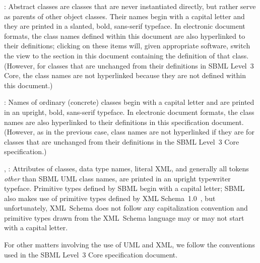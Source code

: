 \begin{description}

\item {}: Abstract classes are classes that
are never instantiated directly, but rather serve as parents of other
object classes. Their names begin with a capital letter and they are
printed in a slanted, bold, sans-serif typeface. In electronic document
formats, the class names defined within this document are also
hyperlinked to their definitions; clicking on these items will, given
appropriate software, switch the view to the section in this document
containing the definition of that class. (However, for classes that are
unchanged from their definitions in SBML Level~3 Core, the class names
are not hyperlinked because they are not defined within this document.)

\item {}: Names of ordinary (concrete) classes begin with a
capital letter and are printed in an upright, bold, sans-serif typeface.
In electronic document formats, the class names are also hyperlinked to
their definitions in this specification document. (However, as in the
previous case, class names are not hyperlinked if they are for classes
that are unchanged from their definitions in the SBML Level~3 Core
specification.)

\item {}, : Attributes of classes, data
type names, literal XML, and generally all tokens \emph{other} than SBML
UML class names, are printed in an upright typewriter typeface.
Primitive types defined by SBML begin with a capital letter; SBML also
makes use of primitive types defined by XML
Schema~1.0~\citep{biron:2000,fallside:2000,thompson:2000}, but
unfortunately, XML~Schema does not follow any capitalization convention
and primitive types drawn from the XML~Schema language may or may not
start with a capital letter.

\end{description}

For other matters involving the use of UML and XML, we follow the
conventions used in the SBML Level~3 Core specification document.

